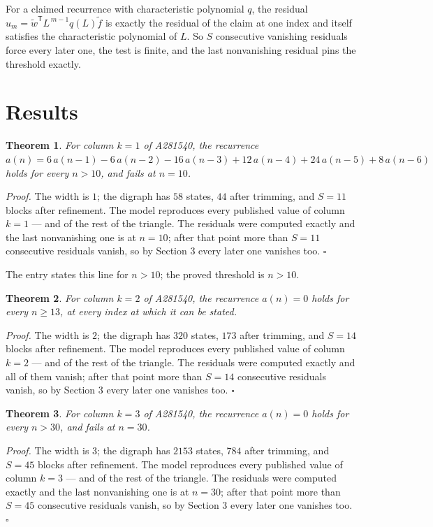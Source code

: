 \documentclass[11pt]{article}
\newtheorem{theorem}{Theorem}
\theoremstyle{definition}
\begin{document}
For a claimed recurrence with characteristic polynomial $q$, the residual $u_m = \tilde w^{\mathsf T}L^{\,m-1}q(L)\tilde f$ is exactly the residual of the claim at one index and itself satisfies the characteristic polynomial of $L$. So $S$ consecutive vanishing residuals force every later one, the test is finite, and the last nonvanishing residual pins the threshold exactly.

\section{Results}

\begin{theorem} For column $k = 1$ of A281540, the recurrence $a(n) = 6\,a(n-1) - 6\,a(n-2) - 16\,a(n-3) + 12\,a(n-4) + 24\,a(n-5) + 8\,a(n-6)$ holds for every $n > 10$, and fails at $n = 10$.\end{theorem}

{\itshape Proof.} The width is $1$; the digraph has $58$ states, $44$ after trimming, and $S = 11$ blocks after refinement. The model reproduces every published value of column $k = 1$ --- and of the rest of the triangle. The residuals were computed exactly and the last nonvanishing one is at $n = 10$; after that point more than $S = 11$ consecutive residuals vanish, so by Section 3 every later one vanishes too. $\square$

The entry states this line for $n > 10$; the proved threshold is $n > 10$.

\begin{theorem} For column $k = 2$ of A281540, the recurrence $a(n) = 0$ holds for every $n \ge 13$, at every index at which it can be stated.\end{theorem}

{\itshape Proof.} The width is $2$; the digraph has $320$ states, $173$ after trimming, and $S = 14$ blocks after refinement. The model reproduces every published value of column $k = 2$ --- and of the rest of the triangle. The residuals were computed exactly and all of them vanish; after that point more than $S = 14$ consecutive residuals vanish, so by Section 3 every later one vanishes too. $\square$

\begin{theorem} For column $k = 3$ of A281540, the recurrence $a(n) = 0$ holds for every $n > 30$, and fails at $n = 30$.\end{theorem}

{\itshape Proof.} The width is $3$; the digraph has $2153$ states, $784$ after trimming, and $S = 45$ blocks after refinement. The model reproduces every published value of column $k = 3$ --- and of the rest of the triangle. The residuals were computed exactly and the last nonvanishing one is at $n = 30$; after that point more than $S = 45$ consecutive residuals vanish, so by Section 3 every later one vanishes too. $\square$
\end{document}
